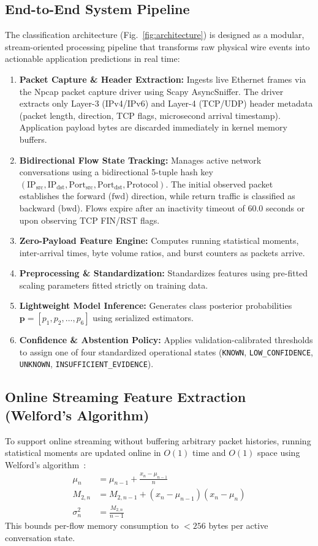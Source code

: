 \documentclass[conference]{IEEEtran}
\begin{document}
\subsection{End-to-End System Pipeline}
The classification architecture (Fig.~\ref{fig:architecture}) is designed as a modular, stream-oriented processing pipeline that transforms raw physical wire events into actionable application predictions in real time:
\begin{enumerate}
    \item \textbf{Packet Capture \& Header Extraction:} Ingests live Ethernet frames via the Npcap packet capture driver using Scapy AsyncSniffer. The driver extracts only Layer-3 (IPv4/IPv6) and Layer-4 (TCP/UDP) header metadata (packet length, direction, TCP flags, microsecond arrival timestamp). Application payload bytes are discarded immediately in kernel memory buffers.
    \item \textbf{Bidirectional Flow State Tracking:} Manages active network conversations using a bidirectional 5-tuple hash key $(\text{IP}_{\text{src}}, \text{IP}_{\text{dst}}, \text{Port}_{\text{src}}, \text{Port}_{\text{dst}}, \text{Protocol})$. The initial observed packet establishes the forward ($\text{fwd}$) direction, while return traffic is classified as backward ($\text{bwd}$). Flows expire after an inactivity timeout of 60.0 seconds or upon observing TCP FIN/RST flags.
    \item \textbf{Zero-Payload Feature Engine:} Computes running statistical moments, inter-arrival times, byte volume ratios, and burst counters as packets arrive.
    \item \textbf{Preprocessing \& Standardization:} Standardizes features using pre-fitted scaling parameters fitted strictly on training data.
    \item \textbf{Lightweight Model Inference:} Generates class posterior probabilities $\mathbf{p} = [p_1, p_2, \dots, p_6]$ using serialized estimators.
    \item \textbf{Confidence \& Abstention Policy:} Applies validation-calibrated thresholds to assign one of four standardized operational states (\texttt{KNOWN}, \texttt{LOW\_CONFIDENCE}, \texttt{UNKNOWN}, \texttt{INSUFFICIENT\_EVIDENCE}).
\end{enumerate}

\subsection{Online Streaming Feature Extraction (Welford's Algorithm)}
To support online streaming without buffering arbitrary packet histories, running statistical moments are updated online in $O(1)$ time and $O(1)$ space using Welford's algorithm~\cite{welford1962note}:
\begin{align}
    \mu_n &= \mu_{n-1} + \frac{x_n - \mu_{n-1}}{n} \\
    M_{2,n} &= M_{2,n-1} + (x_n - \mu_{n-1})(x_n - \mu_n) \\
    \sigma_n^2 &= \frac{M_{2,n}}{n - 1}
\end{align}
This bounds per-flow memory consumption to $< 256$ bytes per active conversation state.
\end{document}
